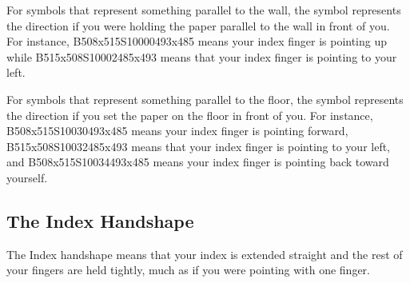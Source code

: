 \documentclass{article}
\begin{document}
For symbols that represent something parallel to the wall, the symbol represents the direction if you were holding the paper parallel to the wall in front of you.
For instance, {\small B508x515S10000493x485} means your index finger is pointing up while {\small B515x508S10002485x493} means that your index finger is pointing to your left.

For symbols that represent something parallel to the floor, the symbol represents the direction if you set the paper on the floor in front of you.
For instance, {\small B508x515S10030493x485} means your index finger is pointing forward, {\small B515x508S10032485x493} means that your index finger is pointing to your left, and {\small B508x515S10034493x485} means your index finger is pointing back toward yourself.

\subsection{The Index Handshape}

The Index handshape means that your index is extended straight and the rest of your fingers are held tightly, much as if you were pointing with one finger.
\end{document}
